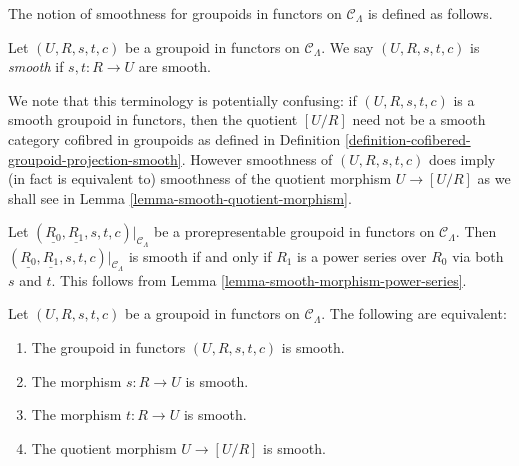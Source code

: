 \noindent
The notion of smoothness for groupoids in functors on $\mathcal{C}_\Lambda$ is
defined as follows.

\begin{definition}
\label{definition-smooth-groupoid-in-functors}
Let $(U, R, s, t, c)$ be a groupoid in functors on $\mathcal{C}_\Lambda$. We
say $(U, R, s, t, c)$ is {\it smooth} if $s, t: R \to U$ are smooth.
\end{definition}

\begin{remark}
\label{remark-smooth-groupoid-in-functors-warning}
We note that this terminology is potentially confusing:
if $(U, R, s, t, c)$ is a smooth groupoid in functors, then the quotient
$[U/R]$ need not be a smooth category cofibred in groupoids as defined in
Definition \ref{definition-cofibered-groupoid-projection-smooth}.
However smoothness of $(U, R, s, t, c)$ does imply (in fact is equivalent to)
smoothness of the quotient morphism $U \to [U/R]$ as we shall
see in
Lemma \ref{lemma-smooth-quotient-morphism}.
\end{remark}

\begin{remark}
\label{remark-smooth-power-series-prorepresentable-smooth-groupoid-in-functors}
Let $(\underline{R_0}, \underline{R_1}, s, t, c)|_{\mathcal{C}_\Lambda}$
be a prorepresentable groupoid in functors on $\mathcal{C}_\Lambda$.
Then $(\underline{R_0}, \underline{R_1}, s, t, c)|_{\mathcal{C}_\Lambda}$
is smooth if and only if $R_1$ is a power series over $R_0$ via both $s$
and $t$. This follows from
Lemma \ref{lemma-smooth-morphism-power-series}.
\end{remark}

\begin{lemma}
\label{lemma-smooth-quotient-morphism}
Let $(U, R, s, t, c)$ be a groupoid in functors on $\mathcal{C}_\Lambda$.
The following are equivalent:
\begin{enumerate}
\item The groupoid in functors $(U, R, s, t, c)$ is smooth.
\item The morphism $s : R \to U$ is smooth.
\item The morphism $t : R \to U$ is smooth.
\item The quotient morphism $U \to [U/R]$ is smooth.
\end{enumerate}
\end{lemma}

